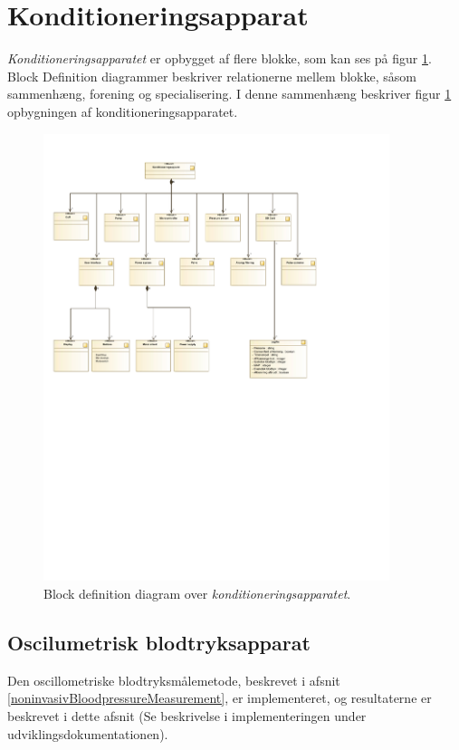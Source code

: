 \section{Konditioneringsapparat}
\textit{Konditioneringsapparatet} er opbygget af flere blokke, som kan ses på figur \ref{fig:BDD(SystemOverview)}. Block Definition diagrammer beskriver relationerne mellem blokke, såsom sammenhæng, forening og specialisering. I denne sammenhæng beskriver figur \ref{fig:BDD(SystemOverview)} opbygningen af konditioneringsapparatet. 
\begin{figure}[H]
	\centering
	\includegraphics[width=0.9\textwidth]{billeder/BDD(SystemOverview).pdf}
	\caption{Block definition diagram over \textit{konditioneringsapparatet}.}\label{fig:BDD(SystemOverview)}
\end{figure}

\subsection{Oscilumetrisk blodtryksapparat}
Den oscillometriske blodtryksmålemetode, beskrevet i afsnit \ref{noninvasivBloodpressureMeasurement}, er implementeret, og resultaterne er beskrevet i dette afsnit (Se beskrivelse i implementeringen under udviklingsdokumentationen).

